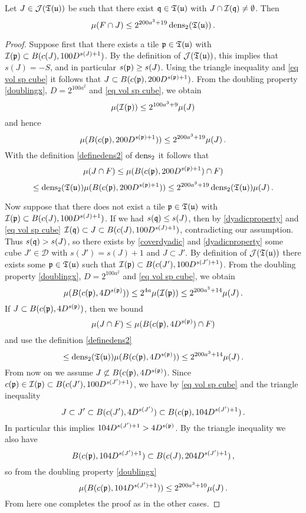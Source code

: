 \begin{lemma}
    \label{lem 2density estimate tree}
    Let $J \in \mathcal{J}(\mathfrak T(\mathfrak u))$ be such that there exist $\mathfrak q \in \mathfrak T(\mathfrak u)$ with $J \cap \mathcal{I}(\mathfrak q) \ne \emptyset$. Then
    $$
        \mu(F \cap J) \le 2^{200a^3 + 19} \operatorname{\operatorname{dens}}_2(\mathfrak T(\mathfrak u))\,.
    $$
\end{lemma}

\begin{proof}
    Suppose first that there exists a tile $\mathfrak p \in \mathfrak T(\mathfrak u)$ with $\mathcal{I}(\mathfrak p) \subset B(c(J), 100 D^{s(J) + 1})$. By the definition of $\mathcal{J}(\mathfrak T(\mathfrak u))$, this implies that $s(J) = -S$, and in particular $s(\mathfrak p) \ge s(J)$. Using the triangle inequality and \eqref{eq vol sp cube} it follows that $J \subset B(c(\mathfrak p), 200 D^{s(\mathfrak p) + 1})$. From the doubling property \eqref{doublingx}, $D=2^{100a^2}$ and \eqref{eq vol sp cube}, we obtain
    $$
        \mu(\mathcal{I}(\mathfrak p)) \le 2^{100a^3 + 9} \mu(J)
    $$
    and hence
    $$
        \mu( B(c(\mathfrak p), 200 D^{s(\mathfrak p) + 1})) \le 2^{200a^3 +19} \mu(J)\,.
    $$
    With the definition \eqref{definedens2} of $\operatorname{\operatorname{dens}}_2$ it follows that
    $$
        \mu(J \cap F) \le \mu( B(c(\mathfrak p), 200 D^{s(\mathfrak p) + 1}) \cap F)
    $$
    $$
        \le \operatorname{\operatorname{dens}}_2(\mathfrak T(\mathfrak u)) \mu( B(c(\mathfrak p), 200 D^{s(\mathfrak p) + 1})) \le 2^{200a^3 +19} \operatorname{\operatorname{dens}}_2(\mathfrak T(\mathfrak u))\mu(J)\,.
    $$

    Now suppose that there does not exist a tile $\mathfrak p \in \mathfrak T(\mathfrak u)$ with $\mathcal{I}(\mathfrak p) \subset B(c(J), 100 D^{s(J) + 1})$. If we had $s(\mathfrak q) \le s(J)$, then by \eqref{dyadicproperty} and \eqref{eq vol sp cube}  $\mathcal{I}(\mathfrak q) \subset J \subset B(c(J), 100 D^{s(J) + 1})$, contradicting our assumption. Thus $s(\mathfrak q) > s(J)$, so there exists by \eqref{coverdyadic} and \eqref{dyadicproperty} some cube $J' \in \mathcal{D}$ with $s(J') = s(J) + 1$ and $J \subset J'$. By definition of $\mathcal{J}(\mathfrak T(\mathfrak u))$ there exists some $\mathfrak p \in \mathfrak T(\mathfrak u)$ such that $\mathcal{I}(\mathfrak p) \subset B(c(J'), 100 D^{s(J') + 1})$.  From the doubling property \eqref{doublingx}, $D=2^{100a^2}$ and \eqref{eq vol sp cube}, we obtain
    \begin{equation}
        \label{eq measure comparison 1}
        \mu(B(c(\mathfrak p), 4D^{s(\mathfrak p)})) \le 2^{4a} \mu(\mathcal{I}(\mathfrak p)) \le 2^{200a^3 + 14} \mu(J)\,.
    \end{equation}
    If $J \subset B(c(\mathfrak p), 4 D^{s(\mathfrak p)})$, then we bound
    $$
        \mu(J \cap F) \le \mu(B(c(\mathfrak p), 4D^{s(\mathfrak p)}) \cap F)
    $$
    and use the definition \eqref{definedens2}
    $$
        \le \operatorname{\operatorname{dens}}_2(\mathfrak T(\mathfrak u)) \mu(B(c(\mathfrak p), 4D^{s(\mathfrak p)})) \le 2^{200a^3 + 14} \mu(J)\,.
    $$
    From now on we assume $J \not \subset B(c(\mathfrak p), 4 D^{s(\mathfrak p)})$.
    Since $c(\mathfrak p) \in \mathcal{I}(\mathfrak p) \subset B(c(J'), 100 D^{s(J') + 1})$, we have by \eqref{eq vol sp cube} and the triangle inequality
    $$
        J \subset J' \subset B(c(J'), 4D^{s(J')}) \subset B(c(\mathfrak p), 104 D^{s(J') + 1})\,.
    $$
    In particular this implies $104 D^{s(J') + 1} > 4D^{s(\mathfrak p)}$. By the triangle inequality we also have
    $$
        B(c(\mathfrak p), 104 D^{s(J') + 1}) \subset B(c(J), 204 D^{s(J') + 1})\,,
    $$
    so from the doubling property \eqref{doublingx}
    $$
        \mu( B(c(\mathfrak p), 104 D^{s(J') + 1})) \le 2^{200a^3 + 10} \mu(J)\,.
    $$
    From here one completes the proof as in the other cases.
\end{proof}


